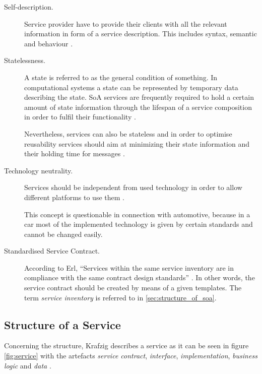 \begin{description}
\item [Self-description.]
Service provider have to provide their clients with all the relevant information in form of a service description. This includes syntax, semantic and behaviour \cite{breivold}.

\item [Statelessness.]
A state is referred to as the general condition of something. In computational systems a state can be represented by temporary data describing the state. SoA services are frequently required to hold a certain amount of state information through the lifespan of a service composition in order to fulfil their functionality \cite[ch.11]{erl2008}. 

Nevertheless, services can also be stateless and in order to optimise reusability services should aim at minimizing their state information and their holding time for messages \cite{breivold} \cite[p.27]{erl2011}.

\item [Technology neutrality.]
Services should be independent from used technology in order to allow different platforms to use them \cite{breivold}. 

This concept is questionable in connection with automotive, because in a car most of the implemented technology is given by certain standards and cannot be changed easily.

\item [Standardised Service Contract.]
According to Erl, ``Services within the same service inventory are in compliance with the same contract design standards'' \cite[p.27]{erl2011}. In other words, the service contract should be created by means of a given templates. The term \emph{service inventory} is referred to in \ref{sec:structure_of_soa}.
\end{description}



\subsection{Structure of a Service}
\label{sec:service_structure}
Concerning the structure, Krafzig describes a service as it can be seen in figure \ref{fig:service} with the artefacts \emph{service contract}, \emph{interface}, \emph{implementation}, \emph{business logic} and \emph{data} \cite[p.44]{krafzig}.

